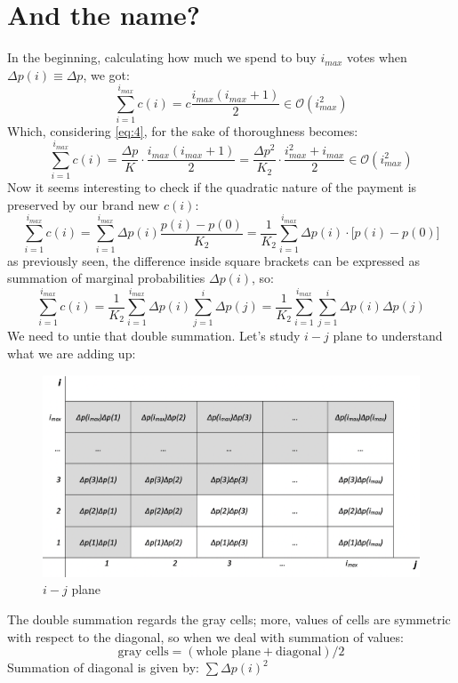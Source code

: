 \documentclass[10pt,a4paper]{article}
\begin{document}
	\section{And the name?}
	In the beginning, calculating how much we spend to buy $i_{max}$ votes when
	$\Delta p(i) \equiv \Delta p$, we got:
	\begin{equation*}
		\sum_{i=1}^{i_{max}} c(i) = c \frac{i_{max}(i_{max}+1)}{2} \in \mathcal{O}(i_{max}^2)
	\end{equation*}
	Which, considering \ref{eq:4}, for the sake of thoroughness becomes:
	\begin{equation}\label{eq:8}
		\sum_{i=1}^{i_{max}} c(i) = \frac{\Delta p}{K} \cdot \frac{i_{max}(i_{max}+1)}{2} = \frac{\Delta p^{2}}{K_{2}} \cdot \frac{i_{max}^{2}+i_{max}}{2}\in \mathcal{O}(i_{max}^2)
	\end{equation}
	Now it seems interesting to check if the quadratic nature of the payment is preserved by our brand new $c(i)$:
	\begin{equation*}
		\sum_{i=1}^{i_{max}} c(i) = \sum_{i=1}^{i_{max}} \Delta p(i) \frac{p(i)-p(0)}{K_{2}} = \frac{1}{K_{2}} \sum_{i=1}^{i_{max}} \Delta p(i) \cdot \big[ p(i)-p(0) \big]
	\end{equation*}
	as previously seen, the difference inside square brackets can be expressed as summation of marginal probabilities $\Delta p(i)$, so:
	\begin{equation}\label{eq:9}
		\sum_{i=1}^{i_{max}} c(i) =  \frac{1}{K_{2}} \sum_{i=1}^{i_{max}} \Delta p(i) \sum_{j=1}^{i} \Delta p(j) =  \frac{1}{K_{2}} \sum_{i=1}^{i_{max}} \sum_{j=1}^{i} \Delta p(i) \Delta p(j)
	\end{equation}
	We need to untie that double summation. Let’s study $i-j$ plane to understand what we are adding up:
	\begin{figure}[H]	
		\centering
		\includegraphics[height=0.33\textheight]{FIG/ijplane.png}
		\caption{$i-j$ plane}
		\label{fig:ijplane}
	\end{figure}
	The double summation regards the gray cells; more, values of cells are symmetric with respect to the diagonal, so when we deal with summation of values:
	\begin{equation}\label{eq:10}
		\textrm{gray cells} = (\textrm{whole plane}+\textrm{diagonal}) / 2
	\end{equation}
	Summation of diagonal is given by: $\sum \Delta p(i)^{2}$
	
\end{document}
